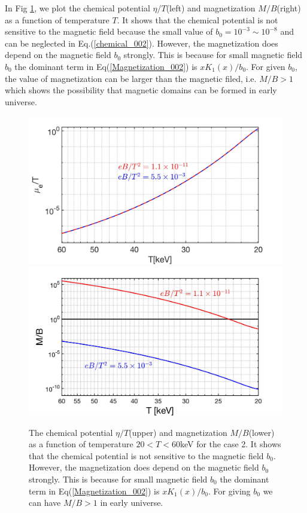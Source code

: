 \documentclass[Universe,article,submit,moreauthors,pdftex]{Definitions/mdpi}
\begin{document}
\begin{itemize}
In Fig {\ref{Case2_fig}}, we plot the chemical potential $\eta/T$(left) and magnetization $M/B$(right) as a function of temperature $T$. It shows that the chemical potential is not sensitive to the magnetic field because the small value of $b_0=10^{-3}\sim10^{-8}$ and can be neglected in Eq.(\ref{chemical_002}). However, the magnetization does depend on the magnetic field $b_0$ strongly. This is because for small magnetic field $b_0$ the dominant term in Eq(\ref{Magnetization_002}) is $xK_1(x)/b_0$. For given $b_0$, the value of magnetization can be larger than the magnetic filed, i.e. $M/B>1$  which shows the possibility that magnetic domains can be formed in early universe.

\begin{figure}[h]
\centering
\includegraphics[width=0.75\linewidth]{ChemicalPotential_case2.jpg}
\includegraphics[width=0.75\linewidth]{Magnetization_case2.jpg}
\caption{The chemical potential $\eta/T$(upper) and magnetization $M/B$(lower) as a function of temperature $20<T<60$keV  for the case 2.  It shows that the chemical potential is not sensitive to the magnetic field $b_0$. However, the magnetization does depend on the magnetic field $b_0$ strongly. This is because for small magnetic field $b_0$ the dominant term in Eq(\ref{Magnetization_002}) is $xK_1(x)/b_0$. For giving $b_0$  we can have $M/B>1$ in early universe.}
\label{Case2_fig} 
\end{figure}

\end{itemize}
\end{document}
